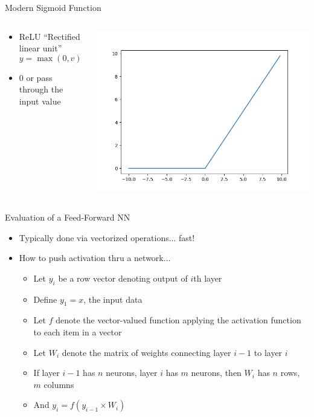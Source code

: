 \documentclass[aspectratio=169]{beamer}
\begin{document}
\begin{frame}{Modern Sigmoid Function}

\begin{columns}
\begin{column}{0.6\textwidth}
\begin{itemize}
		\item ReLU ``Rectified linear unit''
		$$y = \max(0, v)$$
		\item 0 or pass through the input value
\end{itemize}
\end{column}
\begin{column}{0.5\textwidth}
\includegraphics[width=1\textwidth]{lectFF/reLU.png}
\end{column}
\end{columns}

	\end{frame}
\begin{frame}{Evaluation of a Feed-Forward NN}

\begin{itemize}
	\item Typically done via vectorized operations... fast!
        \item How to push activation thru a network...
	\begin{itemize}
	\item Let $y_i$ be a row vector denoting output of $i$th layer
	\item Define $y_1 = x$, the input data
	\item Let $f$ denote the vector-valued function applying the activation function to each item in a vector
	\item Let $W_{i}$ denote the matrix of weights connecting layer $i-1$ to layer $i$
	\item If layer $i-1$ has $n$ neurons, layer $i$ has $m$ neurons, then $W_{i}$ has $n$ rows, $m$ columns
	\item And $y_i = f(y_{i-1} \times W_{i})$
        \end{itemize}
\end{itemize}
\end{frame}
\end{document}
